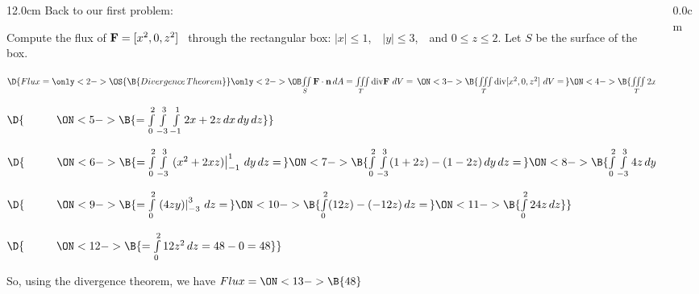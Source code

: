 \begin{frame}
\frametitle{}
\scriptsize
\begin{columns}
\begin{column}{12.0cm}
Back to our first problem:

\vspace{0.2cm}

Compute the flux of ${\bf F} = [x^2,0,z^2]$ \, through the rectangular box: $|x| \le 1$, \,\, $|y| \le 3$, \,\, and $0 \le z \le 2$. \quad Let $S$ be the surface of the box.

\vspace{0.8cm}

$\D{Flux = \only<2->{\OS{\B{ Divergence \, Theorem }}}{\only<2->{\OB}{ \iint \limits_{S} {\bf F} \cdot {\bf n}\, dA = \iiint \limits_{T} \text{div} {\bf F} \,\, dV }} = \,
\ON<3->{\B{\iiint \limits_{T} \text{div} [x^2,0,z^2] \,\, dV = \,}}
\ON<4->{\B{\iiint \limits_{T} 2x + 2z \,\, dV}}}$

$\D{\hspace{1.0cm} 
\ON<5->{\B{= \int \limits_{0}^{2} \int \limits_{-3}^{3}\int \limits_{-1}^{1} 2x+2z\, dx\,dy\,dz}}}$

$\D{\hspace{1.0cm} 
\ON<6->{\B{= \int \limits_{0}^{2} \int \limits_{-3}^{3} \left. (x^2+2xz) \right|_{-1}^{1}\,dy\,dz =\,}}
\ON<7->{\B{\int \limits_{0}^{2} \int \limits_{-3}^{3} (1+2z)-(1-2z) \,dy\,dz = \,}}
\ON<8->{\B{\int \limits_{0}^{2} \int \limits_{-3}^{3} 4z \,dy\,dz}}}$ \quad 
{}

$\D{\hspace{1.0cm} 
\ON<9->{\B{= \int \limits_{0}^{2} \left.(4zy)\right|_{-3}^{3}\,dz =\,}} 
\ON<10->{\B{\int \limits_{0}^{2} (12z)-(-12z)\,dz =\,}} 
\ON<11->{\B{\int \limits_{0}^{2} 24z \,dz}}}$ \hspace{3.1cm} 

$\D{\hspace{1.0cm} 
\ON<12->{\B{= \int \limits_{0}^{2} 12z^2 \,dz = 48-0 = 48}}}$ \hspace{6.0cm} 
	
\vspace{1.0cm}

So, using the divergence theorem, we have \quad $Flux = \ON<13->{\B{48}}$
\end{column}
\begin{column}{0.0cm}\end{column}
\end{columns}
\end{frame}


